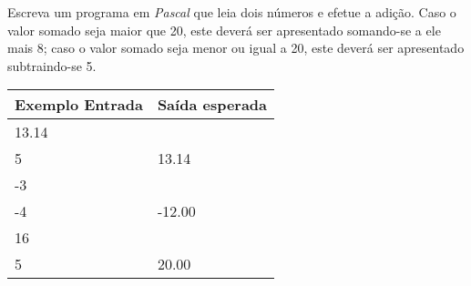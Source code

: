 \item Escreva um programa em \emph{Pascal} que leia dois números e efetue a 
adição. Caso o valor somado seja maior que 20, este deverá ser apresentado 
somando-se a ele mais 8; caso o valor somado seja menor ou igual a 20, 
este deverá ser apresentado subtraindo-se 5.

\begin{center}
\begin{tabular}{|l|l|} \hline
Exemplo Entrada & Saída esperada \\ \hline
13.14                &                \\
5                &    13.14            \\ \hline
-3                &                \\
-4                &   -12.00             \\ \hline
16                &                \\
5                &    20.00            \\ \hline
\end{tabular}
\end{center}

